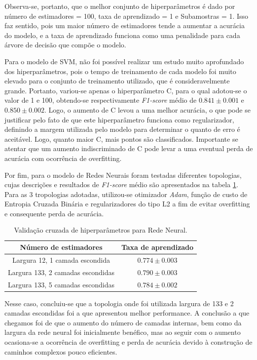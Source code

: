 \documentclass{homework}
\begin{document}
Observa-se, portanto, que o melhor conjunto de hiperparâmetros é dado por número de estimadores = 100, taxa de
aprendizado = 1 e Subamostras = 1. Isso faz sentido, pois um maior número de estimadores tende a aumentar a acurácia do
modelo, e a taxa de aprendizado funciona como uma penalidade para cada árvore de decisão que compõe o modelo.

Para o modelo de SVM, não foi possível realizar um estudo muito aprofundado dos hiperparâmetros, pois o tempo de
treinamento de cada modelo foi muito elevado para o conjunto de treinamento utilizado, que é consideravelmente grande.
Portanto, variou-se apenas o hiperparâmetro C, para o qual adotou-se o valor de 1 e 100, obtendo-se respectivamente
\textit{F1-score} médio de $0.841 \pm 0.001$ e $0.850 \pm 0.002$. Logo, o aumento de C levou a uma melhor acurácia, o
que pode se justificar pelo fato de que este hiperparâmetro funciona como regularizador, definindo a margem utilizada
pelo modelo para determinar o quanto de erro é aceitável. Logo, quanto maior C, mais pontos são classificados.
Importante se atentar que um aumento indiscriminado de C pode levar a uma eventual perda de acurácia com ocorrência de
overfitting.

Por fim, para o modelo de Redes Neurais foram testadas diferentes topologias, cujas descrições e resultados de
\textit{F1-score} médio são apresentados na tabela \ref{nn_topology}. Para as 3 tropologias adotadas, utilizou-se
otimizador \textit{Adam}, função de custo de Entropia Cruzada Binária e regularizadores do tipo L2 a fim de evitar
overfitting e consequente perda de acurácia.

\begin{table}[h!]
    \centering
    \begin{tabular}{|c|c|}
        \hline
        \textbf{Número de estimadores} & \textbf{Taxa de aprendizado} \\
        \hline
        Largura 12, 1 camada escondida & $0.774 \pm 0.003$ \\
        \hline
        Largura 133, 2 camadas escondidas & $0.790 \pm 0.003$ \\
        \hline
        Largura 133, 5 camadas escondidas & $0.784 \pm 0.002$ \\
        \hline
    \end{tabular}
    \caption{Validação cruzada de hiperparâmetros para Rede Neural.}
    \label{nn_topology}
\end{table}

Nesse caso, concluiu-se que a topologia onde foi utilizada largura de 133 e 2 camadas escondidas foi a que apresentou
melhor performance. A conclusão a que chegamos foi de que o aumento do número de camadas internas, bem como da largura
da rede neural foi inicialmente benéfico, mas ao seguir com o aumento ocasiona-se a ocorrência de overfitting e perda
de acurácia devido à construção de caminhos complexos pouco eficientes.
\end{document}
